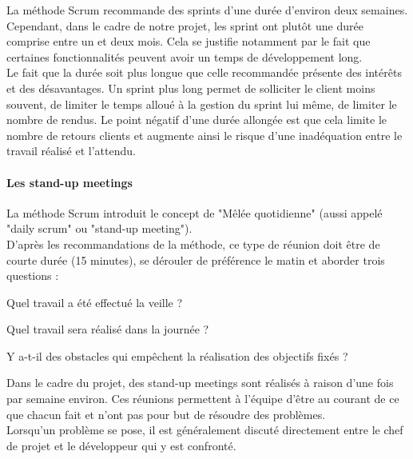 La méthode Scrum recommande des sprints d'une durée d'environ deux semaines. Cependant, dans le cadre de notre projet, les sprint ont plutôt une durée comprise entre un et deux mois. Cela se justifie notamment par le fait que certaines fonctionnalités peuvent avoir un temps de développement long.\\
Le fait que la durée soit plus longue que celle recommandée présente des intérêts et des désavantages. 
Un sprint plus long permet de solliciter le client moins souvent, de limiter le temps alloué à la gestion du sprint lui même, de limiter le nombre de rendus.
Le point négatif d'une durée allongée est que cela limite le nombre de retours clients et augmente ainsi le risque d'une inadéquation entre le travail réalisé et l'attendu.

\paragraph*{Les stand-up meetings}
La méthode Scrum introduit le concept de "Mêlée quotidienne" (aussi appelé "daily scrum" ou "stand-up meeting").\\
D'après les recommandations de la méthode, ce type de réunion doit être de courte durée (15 minutes), se dérouler de préférence le matin et aborder trois questions :
\begin{sitemize}
\item Quel travail a été effectué la veille ?
\item Quel travail sera réalisé dans la journée ?
\item Y a-t-il des obstacles qui empêchent la réalisation des objectifs fixés ?
\end{sitemize}

Dans le cadre du projet, des stand-up meetings sont réalisés à raison d'une fois par semaine environ. Ces réunions permettent à l'équipe d'être au courant de ce que chacun fait et n'ont pas pour but de résoudre des problèmes.\\
Lorsqu'un problème se pose, il est généralement discuté directement entre le chef de projet et le développeur qui y est confronté.

